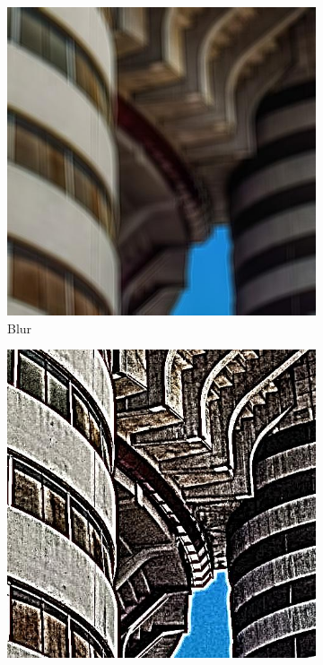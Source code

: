 \begin{figure}[ht]
\begin{subfigure}[b]{0.24\textwidth}
        \includegraphics[width=\textwidth]{img/Blur.jpg}
        \caption{Blur}
        \label{fig:blur}
    \end{subfigure}
    \hfill
    \begin{subfigure}[b]{0.24\textwidth}
        \includegraphics[width=\textwidth]{img/Sharpness.jpg}

\end{subfigure}
\end{figure}
